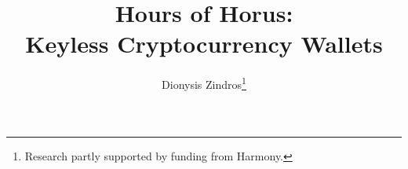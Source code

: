 \title{
  Hours of Horus:\\
  Keyless Cryptocurrency Wallets
}
\ifanonymous{\iflncs
\author{}\institute{}
\fi}
\else
\author{
        Dionysis Zindros\thanks{Research partly supported by funding from Harmony.}
}
\fi
